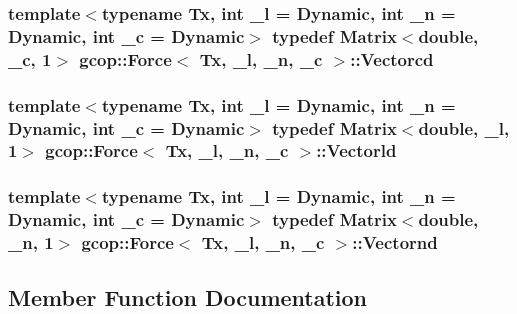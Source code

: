 \subsubsection[{\-Vectorcd}]{\setlength{\rightskip}{0pt plus 5cm}template$<$typename \-Tx, int \-\_\-l = \-Dynamic, int \-\_\-n = \-Dynamic, int \-\_\-c = \-Dynamic$>$ typedef \-Matrix$<$double, \-\_\-c, 1$>$ {\bf gcop\-::\-Force}$<$ \-Tx, \-\_\-l, \-\_\-n, \-\_\-c $>$\-::{\bf \-Vectorcd}}\label{classgcop_1_1Force_abf7f06a404be92a1d6a0139ce5f01d62}
\subsubsection[{\-Vectorld}]{\setlength{\rightskip}{0pt plus 5cm}template$<$typename \-Tx, int \-\_\-l = \-Dynamic, int \-\_\-n = \-Dynamic, int \-\_\-c = \-Dynamic$>$ typedef \-Matrix$<$double, \-\_\-l, 1$>$ {\bf gcop\-::\-Force}$<$ \-Tx, \-\_\-l, \-\_\-n, \-\_\-c $>$\-::{\bf \-Vectorld}}\label{classgcop_1_1Force_ae7435769544569d3348147ff1fbee84b}
\subsubsection[{\-Vectornd}]{\setlength{\rightskip}{0pt plus 5cm}template$<$typename \-Tx, int \-\_\-l = \-Dynamic, int \-\_\-n = \-Dynamic, int \-\_\-c = \-Dynamic$>$ typedef \-Matrix$<$double, \-\_\-n, 1$>$ {\bf gcop\-::\-Force}$<$ \-Tx, \-\_\-l, \-\_\-n, \-\_\-c $>$\-::{\bf \-Vectornd}}\label{classgcop_1_1Force_af71d005e2d8e562bb0dd3b881bc58f24}


\subsection{\-Member \-Function \-Documentation}
